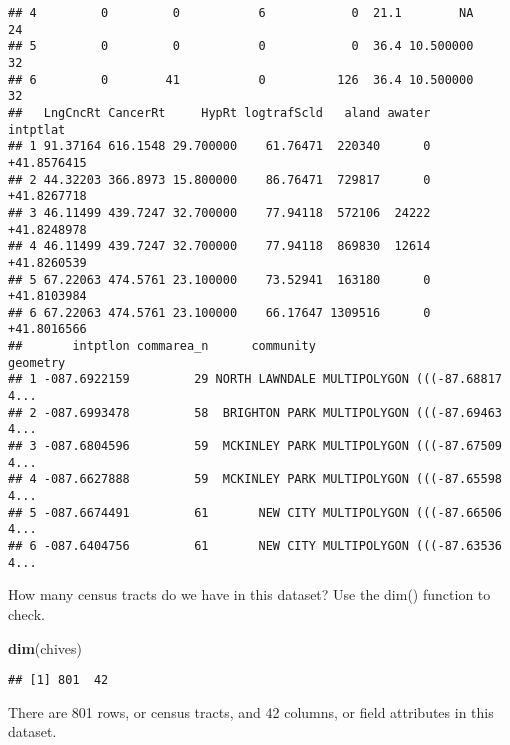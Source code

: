 \documentclass[]{tufte-handout}
\newenvironment{Shaded}{}{}
\newcommand{\KeywordTok}[1]{\textcolor[rgb]{0.00,0.44,0.13}{\textbf{#1}}}
\newcommand{\NormalTok}[1]{#1}
\begin{document}
\begin{verbatim}
## 4         0         0           6            0  21.1        NA        24
## 5         0         0           0            0  36.4 10.500000        32
## 6         0        41           0          126  36.4 10.500000        32
##   LngCncRt CancerRt     HypRt logtrafScld   aland awater    intptlat
## 1 91.37164 616.1548 29.700000    61.76471  220340      0 +41.8576415
## 2 44.32203 366.8973 15.800000    86.76471  729817      0 +41.8267718
## 3 46.11499 439.7247 32.700000    77.94118  572106  24222 +41.8248978
## 4 46.11499 439.7247 32.700000    77.94118  869830  12614 +41.8260539
## 5 67.22063 474.5761 23.100000    73.52941  163180      0 +41.8103984
## 6 67.22063 474.5761 23.100000    66.17647 1309516      0 +41.8016566
##       intptlon commarea_n      community                       geometry
## 1 -087.6922159         29 NORTH LAWNDALE MULTIPOLYGON (((-87.68817 4...
## 2 -087.6993478         58  BRIGHTON PARK MULTIPOLYGON (((-87.69463 4...
## 3 -087.6804596         59  MCKINLEY PARK MULTIPOLYGON (((-87.67509 4...
## 4 -087.6627888         59  MCKINLEY PARK MULTIPOLYGON (((-87.65598 4...
## 5 -087.6674491         61       NEW CITY MULTIPOLYGON (((-87.66506 4...
## 6 -087.6404756         61       NEW CITY MULTIPOLYGON (((-87.63536 4...
\end{verbatim}

How many census tracts do we have in this dataset? Use the dim()
function to check.

\begin{Shaded}
\begin{Highlighting}[]
\KeywordTok{dim}\NormalTok{(chives)}
\end{Highlighting}
\end{Shaded}

\begin{verbatim}
## [1] 801  42
\end{verbatim}

There are 801 rows, or census tracts, and 42 columns, or field
attributes in this dataset.

\hypertarget{section}{%
\subsection{}\label{section}}
\end{document}
